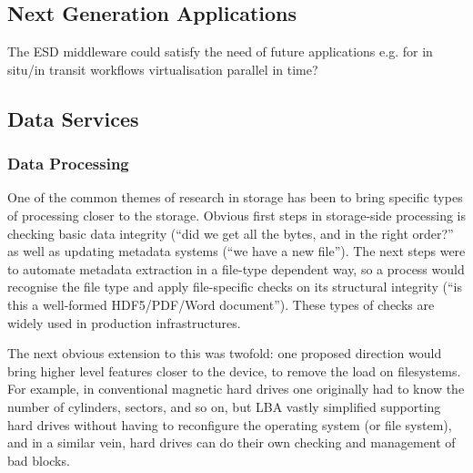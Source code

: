 \documentclass{../../template/esiwace-report}
\begin{document}


\subsection{Next Generation Applications}

The ESD middleware could satisfy the need of future applications e.g. for
	in situ/in transit
	workflows
	virtualisation
	parallel in time?
	





\subsection{Data Services}


\subsubsection{Data Processing}

One of the common themes of research in storage has been to bring specific types of processing closer to the storage.
Obvious first steps in storage-side processing is checking basic data integrity (“did we get all the bytes, and in the
right order?” as well as updating metadata systems (“we have a new file”). The next steps were to automate metadata
extraction in a file-type dependent way, so a process would recognise the file type and apply file-specific checks on
its structural integrity (“is this a well-formed HDF5/PDF/Word document”).  These types of checks are widely used in
production infrastructures.

The next obvious extension to this was twofold: one proposed direction would bring higher level features closer to the
device, to remove the load on filesystems.  For example, in conventional magnetic hard drives one originally had to know
the number of cylinders, sectors, and so on, but LBA vastly simplified supporting hard drives without having to
reconfigure the operating system (or file system), and in a similar vein, hard drives can do their own checking and
management of bad blocks.
\end{document}
